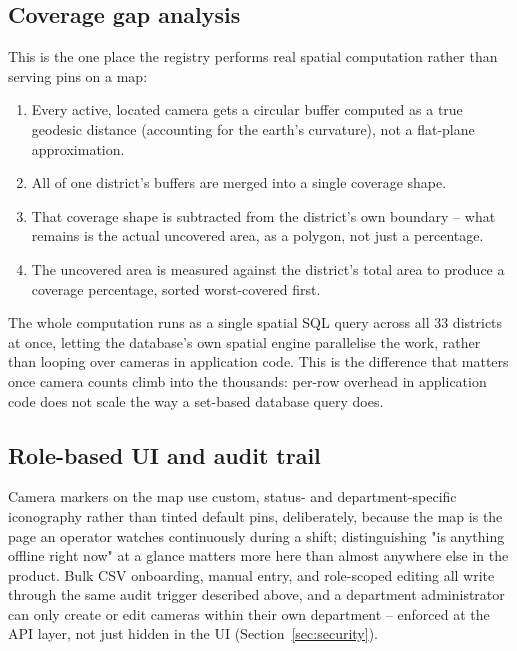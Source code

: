 \documentclass[11pt,a4paper]{article}
\begin{document}
\subsection{Coverage gap analysis}

This is the one place the registry performs real spatial computation rather
than serving pins on a map:

\begin{enumerate}
\item Every active, located camera gets a circular buffer computed as a true
  geodesic distance (accounting for the earth's curvature), not a flat-plane
  approximation.
\item All of one district's buffers are merged into a single coverage shape.
\item That coverage shape is subtracted from the district's own boundary --
  what remains is the actual uncovered area, as a polygon, not just a
  percentage.
\item The uncovered area is measured against the district's total area to
  produce a coverage percentage, sorted worst-covered first.
\end{enumerate}

The whole computation runs as a single spatial SQL query across all 33
districts at once, letting the database's own spatial engine parallelise
the work, rather than looping over cameras in application code. This is
the difference that matters once camera counts climb into the thousands:
per-row overhead in application code does not scale the way a set-based
database query does.

\subsection{Role-based UI and audit trail}

Camera markers on the map use custom, status- and department-specific
iconography rather than tinted default pins, deliberately, because the map
is the page an operator watches continuously during a shift; distinguishing
"is anything offline right now" at a glance matters more here than almost
anywhere else in the product. Bulk CSV onboarding, manual entry, and
role-scoped editing all write through the same audit trigger described
above, and a department administrator can only create or edit cameras
within their own department -- enforced at the API layer, not just hidden
in the UI (Section~\ref{sec:security}).

\end{document}

